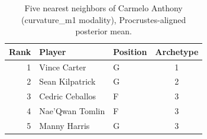 \begin{table}[htbp]
  \centering\small
  \begin{tabular}{rllc}
    \toprule
    Rank & Player & Position & Archetype \\
    \midrule
    1 & Vince Carter & G & 1 \\
    2 & Sean Kilpatrick & G & 2 \\
    3 & Cedric Ceballos & F & 3 \\
    4 & Nae'Qwan Tomlin & F & 3 \\
    5 & Manny Harris & G & 3 \\
    \bottomrule
  \end{tabular}
  \caption{Five nearest neighbors of Carmelo Anthony (curvature_m1 modality), Procrustes-aligned posterior mean.}
  \label{tab:Carmelo_Anthony_neighbors_curvature_m1}
\end{table}

